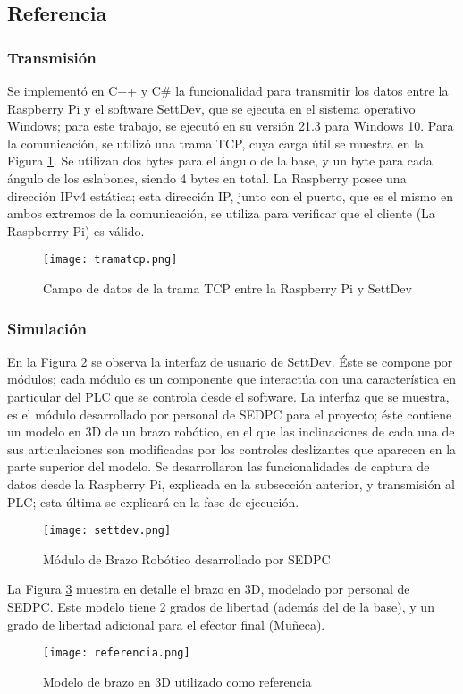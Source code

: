 \subsection{Referencia}

\subsubsection{Transmisión}

Se implementó en C++ y C\# la funcionalidad para transmitir los datos entre la Raspberry Pi y el software SettDev, que se ejecuta en el sistema operativo Windows; para este trabajo, se ejecutó en su versión 21.3 para Windows 10. Para la comunicación, se utilizó una trama TCP, cuya carga útil se muestra en la Figura \ref{fig:tramatcp}. Se utilizan dos bytes para el ángulo de la base, y un byte para cada ángulo de los eslabones, siendo 4 bytes en total. La Raspberry posee una dirección IPv4 estática; esta dirección IP, junto con el puerto, que es el mismo en ambos extremos de la comunicación, se utiliza para verificar que el cliente (La Raspberrry Pi) es válido.

\begin{figure}[htb]
	\centering
	\texttt{[image: tramatcp.png]}
	\caption{Campo de datos de la trama TCP entre la Raspberry Pi y SettDev}
	\label{fig:tramatcp}
\end{figure}

\subsubsection{Simulación}

En la Figura \ref{fig:settdev} se observa la interfaz de usuario de SettDev. Éste se compone por módulos; cada módulo es un componente que interactúa con una característica en particular del PLC que se controla desde el software. La interfaz que se muestra, es el módulo desarrollado por personal de SEDPC para el proyecto; éste contiene un modelo en 3D de un brazo robótico, en el que las inclinaciones de cada una de sus articulaciones son modificadas por los controles deslizantes que aparecen en la parte superior del modelo. Se desarrollaron las funcionalidades de captura de datos desde la Raspberry Pi, explicada en la subsección anterior, y transmisión al PLC; esta última se explicará en la fase de ejecución.

\begin{figure}[htb]
	\centering
	\texttt{[image: settdev.png]}
	\caption{Módulo de Brazo Robótico desarrollado por SEDPC}
	\label{fig:settdev}
\end{figure}

La Figura \ref{fig:referencia} muestra en detalle el brazo en 3D, modelado por personal de SEDPC. Este modelo tiene 2 grados de libertad (además del de la base), y un grado de libertad adicional para el efector final (Muñeca).

\begin{figure}[htb]
	\centering
	\texttt{[image: referencia.png]}
	\caption{Modelo de brazo en 3D utilizado como referencia}
	\label{fig:referencia}
\end{figure}
\newpage